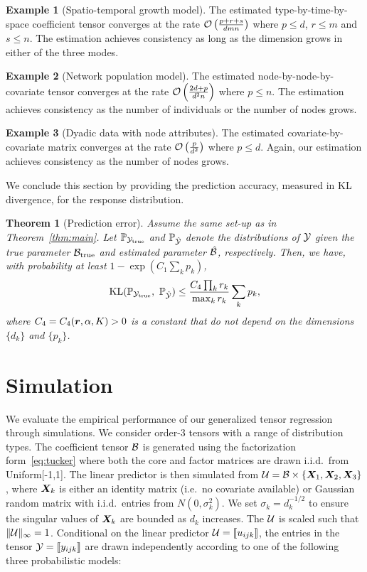 \documentclass[12pt]{article}
\theoremstyle{plain}
\newtheorem{thm}{Theorem}[section]
\theoremstyle{definition}
\newtheorem{example}{Example}
\begin{document}
\begin{example}[Spatio-temporal growth model] The estimated type-by-time-by-space coefficient tensor converges at the rate $\mathcal{O}\left({p+r+s\over dmn}\right)$ where $p\leq d$, $r\leq m$ and $s\leq n$. The estimation achieves consistency as long as the dimension grows in either of the three modes.
\end{example}

\begin{example} [Network population model] The estimated node-by-node-by-covariate tensor converges at the rate $\mathcal{O}\left({2d+p\over d^2n}\right)$ where $p\leq n$. The estimation achieves consistency as the number of individuals or the number of nodes grows. 
\end{example}

\begin{example} [Dyadic data with node attributes] The estimated covariate-by-covariate matrix converges at the rate $\mathcal{O}\left({p\over d^2}\right)$ where $p\leq d$. Again, our estimation achieves consistency as the number of nodes grows. 
\end{example}

We conclude this section by providing the prediction accuracy, measured in KL divergence, for the response distribution.   

\begin{thm}[Prediction error]\label{thm:KL}
Assume the same set-up as in Theorem~\ref{thm:main}. Let $\mathbb{P}_{\mathcal{Y}_{\text{true}}}$ and $\mathbb{P}_{\hat {\mathcal{Y}}}$ denote the distributions of $\mathcal{Y}$ given the true parameter $\mathcal{B}_{\text{true}}$ and estimated parameter $\hat {\mathcal{B}}$, respectively. Then, we have, with probability at least $1-\exp(C_1\sum_k p_k)$,
\[
\text{KL}(\mathbb{P}_{\tY_{\text{true}}},\ \mathbb{P}_{\hat \tY})\leq \frac{ C_{4}\prod_kr_k}{\max_k r_k} \sum_k p_k,
\]
where $C_4=C_4(\bm{r},\alpha, K)>0$ is a constant that do not depend on the dimensions $\{d_k\}$ and $\{p_k\}$.
\end{thm}

\section{Simulation}\label{sec:simulation}
We evaluate the empirical performance of our generalized tensor regression through simulations. We consider order-3 tensors with a range of distribution types. The coefficient tensor $\mathcal{B}$ is generated using the factorization form~\eqref{eq:tucker} where both the core and factor matrices are drawn i.i.d.\ from Uniform[-1,1]. The linear predictor is then simulated from $\mathcal{U}=\mathcal{B}\times\{\bm X_1,\bm X_2,\bm X_3\}$, where $\bm X_k$ is either an identity matrix (i.e.\ no covariate available) or Gaussian random matrix with i.i.d.\ entries from $N(0,\sigma_k^2)$. We set $\sigma_k=d_k^{-1/2}$ to ensure the singular values of $\bm X_k$ are bounded as $d_k$ increases. The $\mathcal{U}$ is scaled such that $\lVert\mathcal{U}\rVert_\infty=1$. Conditional on the linear predictor $\mathcal{U}=\llbracket u_{ijk} \rrbracket$, the entries in the tensor $\mathcal{Y}=\llbracket y_{ijk} \rrbracket$ are drawn independently according to one of the following three probabilistic models:
\end{document}
